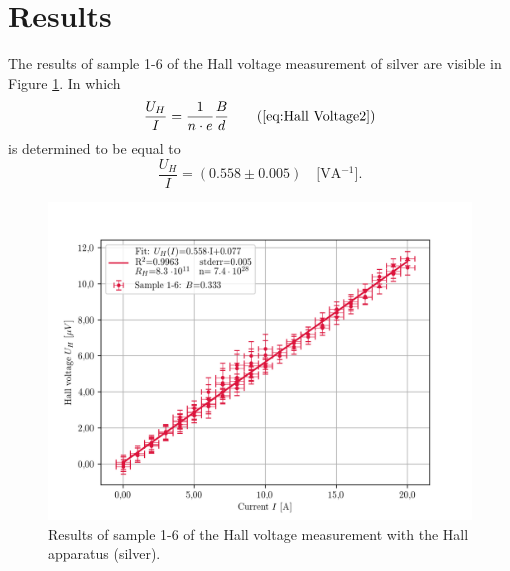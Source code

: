 \section{Results}
The results of sample 1-6 of the Hall voltage measurement of silver are visible in Figure \ref{fig:silver1-6}. In which
    \begin{equation}
        \frac{U_H}{I} = \frac{1}{n \cdot e} \frac{B}{d} \tag{\ref{eq:Hall Voltage2}}
    \end{equation}
is determined to be equal to
    \begin{equation}
        \frac{U_H}{I} = (0.558 \pm 0.005) \quad \text{[VA$^{-1}$]}. \label{eq:result_silver}
    \end{equation}
    \begin{figure}[!htbp]
    \begin{center}
    \includegraphics[scale=0.9]{figuren/resultaten/sample1-6.png}
    \end{center}
    \caption{Results of sample 1-6 of the Hall voltage measurement with the Hall apparatus (silver).}\label{fig:silver1-6}
    \end{figure}
